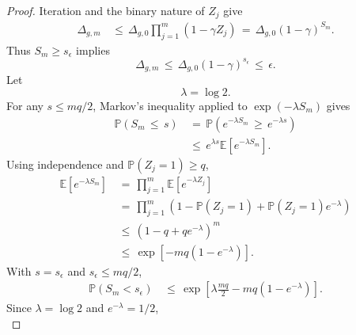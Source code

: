 \documentclass{article} %
\begin{document}
\begin{proof}
Iteration and the binary nature of \(Z_j\) give
\begin{equation}
\begin{aligned}
\Delta_{g,m}
&\,\le\,
\Delta_{g,0}\prod_{j=1}^{m}(1-\gamma Z_j)
\,=\,
\Delta_{g,0}(1-\gamma)^{S_m}.
\end{aligned}
\end{equation}
Thus \(S_m\geq s_\epsilon\) implies
\begin{equation}
\Delta_{g,m}
\,\leq\,
\Delta_{g,0}(1-\gamma)^{s_\epsilon}
\,\leq\,
\epsilon.
\end{equation}
Let
\begin{equation}
\label{eq:app-fifth-contract-lambda}
\lambda=\log 2.
\end{equation}
For any \(s\le mq/2\), Markov's inequality applied to \(\exp(-\lambda S_m)\) gives
\begin{equation}
\label{eq:app-fifth-contract-proof-mgf}
\begin{aligned}
\mathbb{P}(S_m\,\le\, s)
&\,=\,
\mathbb{P}\!\left(e^{-\lambda S_m}\,\ge\, e^{-\lambda s}\right)
\\
&\,\le\,
e^{\lambda s}
\mathbb{E}[e^{-\lambda S_m}].
\end{aligned}
\end{equation}
Using independence and \(\mathbb{P}(Z_j=1)\ge q\),
\begin{equation}
\label{eq:app-fifth-contract-proof-factor}
\begin{aligned}
\mathbb{E}[e^{-\lambda S_m}]
&\,=\,
\prod_{j=1}^{m}
\mathbb{E}[e^{-\lambda Z_j}]
\\
&\,=\,
\prod_{j=1}^{m}
\left(
1-\mathbb{P}(Z_j=1)
+
\mathbb{P}(Z_j=1)e^{-\lambda}
\right)
\\
&\,\le\,
\left(
1-q+qe^{-\lambda}
\right)^m
\\
&\,\le\,
\exp\!\left[-mq(1-e^{-\lambda})\right].
\end{aligned}
\end{equation}
With \(s=s_\epsilon\) and \(s_\epsilon\le mq/2\),
\begin{equation}
\label{eq:app-fifth-contract-proof-chernoff}
\begin{aligned}
\mathbb{P}(S_m<s_\epsilon)
&\,\le\,
\exp\!\left[
\lambda\frac{mq}{2}
-
mq(1-e^{-\lambda})
\right].
\end{aligned}
\end{equation}
Since \(\lambda=\log 2\) and \(e^{-\lambda}=1/2\),
\begin{equation}
\label{eq:app-fifth-contract-proof-constant}

\end{equation}
\end{proof}
\end{document}
